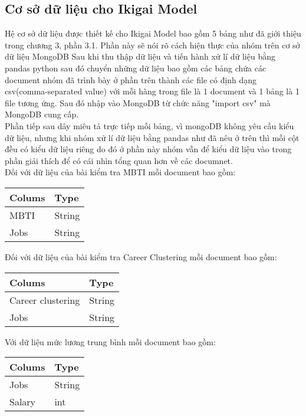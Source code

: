 \subsection{Cơ sở dữ liệu cho Ikigai Model}
\indent Hệ cơ sở dữ liệu được thiết kế cho Ikigai Model bao gồm 5 bảng như đã giới thiệu trong chương 3, phần 3.1. Phần này sẽ nói rõ cách hiện thực của nhóm trên cơ sở dữ liệu MongoDB
\indent Sau khi thu thập dữ liệu và tiến hành xử lí dữ liệu bằng pandas python sau đó chuyển những dữ liệu bao gồm các bảng chứa các document nhóm đã trình bày ở phần trên thành các file có định dạng  csv(comma-separated value) với mỗi hàng trong file là 1 document và 1 bảng là 1 file tương ứng. Sau đó nhập vào MongoDB từ chức năng "import csv" mà MongoDB cung cấp. \\
\indent Phần tiếp sau dây miêu tả trực tiếp mỗi bảng, vì mongoDB không yêu cầu kiểu dữ liệu, nhưng khi nhóm xử lí dữ liệu bằng pandas như đã nêu ở trên thì mỗi cột đều có kiểu dữ liệu riêng do đó ở phần này nhóm vẫn để kiểu dữ liệu vào trong phần giải thích để có cái nhìn tổng quan hơn về các documnet. \\
\newline
\indent Đối với dữ liệu của bài kiểm tra MBTI mỗi document bao gồm:
\begin{table}[H]
    \centering
    \begin{tabular}{@{}ll@{}}
        \toprule
        \textbf{Colums} & \textbf{Type} \\ \midrule
        MBTI & String \\
        Jobs & String \\ \bottomrule
    \end{tabular}
\end{table}

Đối với dữ liệu của bài kiểm tra Career Clustering mỗi document bao gồm:
\begin{table}[H]
    \centering
    \begin{tabular}{@{}ll@{}}
        \toprule
        \textbf{Colums} & \textbf{Type} \\ \midrule
        Career clustering & String \\
        Jobs & String \\ \bottomrule
    \end{tabular}
\end{table}

Với dữ liệu mức lương trung bình mỗi document bao gồm:

\begin{table}[H]
    \centering
    \begin{tabular}{@{}ll@{}}
        \toprule
        \textbf{Colums} & \textbf{Type} \\ \midrule
        Jobs & String \\
        Salary & int \\ \bottomrule
    \end{tabular}
\end{table}

